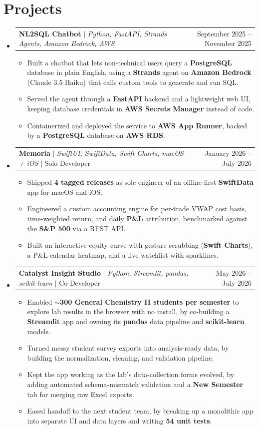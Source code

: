 \documentclass[letterpaper,11pt]{article}
\makeatletter
\newcommand{\resumeItem}[1]{
  \item\small{{#1 \vspace{-3pt}}}
}
\newcommand{\resumeProjectHeading}[2]{
    \item
    \begin{tabular*}{0.97\textwidth}{l@{\extracolsep{\fill}}r}
      \small#1 & #2 \\
    \end{tabular*}\vspace{-9pt}
}
\newcommand{\resumeSubHeadingListStart}{\begin{itemize}[leftmargin=0.15in, label={}]}
\newcommand{\resumeSubHeadingListEnd}{\end{itemize}}
\newcommand{\resumeItemListStart}{\begin{itemize}}
\newcommand{\resumeItemListEnd}{\end{itemize}\vspace{-7pt}}
\makeatother
\begin{document}
\section{Projects}
\resumeSubHeadingListStart
  \resumeProjectHeading
    {\textbf{NL2SQL Chatbot} $|$ \emph{Python, FastAPI, Strands Agents, Amazon Bedrock, AWS}}{September 2025 -- November 2025}
    \resumeItemListStart
      \resumeItem{Built a chatbot that lets non-technical users query a \textbf{PostgreSQL} database in plain English, using a \textbf{Strands} agent on \textbf{Amazon Bedrock} (Claude 3.5 Haiku) that calls custom tools to generate and run SQL.}
      \resumeItem{Served the agent through a \textbf{FastAPI} backend and a lightweight web UI, keeping database credentials in \textbf{AWS Secrets Manager} instead of code.}
      \resumeItem{Containerized and deployed the service to \textbf{AWS App Runner}, backed by a \textbf{PostgreSQL} database on \textbf{AWS RDS}.}
    \resumeItemListEnd
  \resumeProjectHeading
    {\textbf{Memoria} $|$ \emph{SwiftUI, SwiftData, Swift Charts, macOS + iOS} $|$ Solo Developer}{January 2026 -- July 2026}
    \resumeItemListStart
      \resumeItem{Shipped \textbf{4 tagged releases} as sole engineer of an offline-first \textbf{SwiftData} app for macOS and iOS.}
      \resumeItem{Engineered a custom accounting engine for per-trade VWAP cost basis, time-weighted return, and daily \textbf{P\&L} attribution, benchmarked against the \textbf{S\&P 500} via a REST API.}
      \resumeItem{Built an interactive equity curve with gesture scrubbing (\textbf{Swift Charts}), a P\&L calendar heatmap, and a live watchlist with sparklines.}
    \resumeItemListEnd
  \resumeProjectHeading
    {\textbf{Catalyst Insight Studio} $|$ \emph{Python, Streamlit, pandas, scikit-learn} $|$ Co-Developer}{May 2026 -- July 2026}
    \resumeItemListStart
      \resumeItem{Enabled \textbf{$\sim$300 General Chemistry II students per semester} to explore lab results in the browser with no install, by co-building a \textbf{Streamlit} app and owning its \textbf{pandas} data pipeline and \textbf{scikit-learn} models.}
      \resumeItem{Turned messy student survey exports into analysis-ready data, by building the normalization, cleaning, and validation pipeline.}
      \resumeItem{Kept the app working as the lab's data-collection forms evolved, by adding automated schema-mismatch validation and a \textbf{New Semester} tab for merging raw Excel exports.}
      \resumeItem{Eased handoff to the next student team, by breaking up a monolithic app into separate UI and data layers and writing \textbf{54 unit tests}.}
    \resumeItemListEnd
\resumeSubHeadingListEnd
\end{document}
